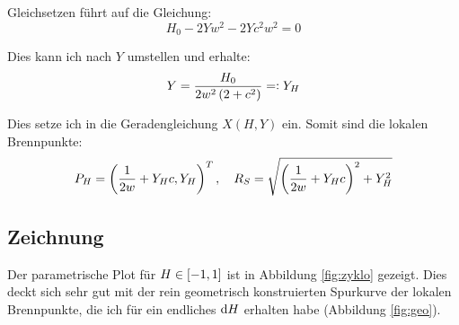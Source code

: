 \documentclass[11pt, ngerman, fleqn]{article}
\begin{document}
Gleichsetzen führt auf die Gleichung:
\[
	H_0 - 2Y w^2 - 2Y c^2 w^2 = 0
\]

Dies kann ich nach $Y$ umstellen und erhalte:
\[
	Y = \frac{H_0}{2 w^2 \del{2 + c^2}} =: Y_H
\]

Dies setze ich in die Geradengleichung $X(H, Y)$ ein. Somit sind die lokalen Brennpunkte:
\[
	P_H = \del{
		\frac{1}{2w} + Y_H c, Y_H
	}^T
	,\quad
	R_S = \sqrt{\del{\frac{1}{2w} + Y_H c}^2 + Y_H^2}
\]

\subsection{Zeichnung}

Der parametrische Plot für $H \in \sbr{-1, 1}$ ist in Abbildung \ref{fig:zyklo}
gezeigt. Dies deckt sich sehr gut mit der rein geometrisch konstruierten
Spurkurve der lokalen Brennpunkte, die ich für ein endliches $\dif H$ erhalten
habe (Abbildung \ref{fig:geo}).
\end{document}
